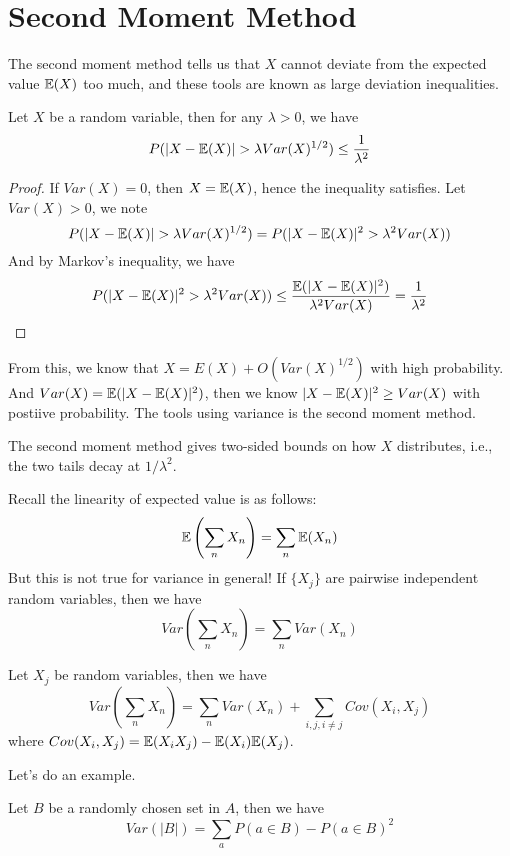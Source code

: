 \section{Second Moment Method}
The second moment method tells us that $X$ cannot deviate from the expected value $\mathbb{E}(X)$ too much, and these tools are known as large deviation inequalities.
\begin{thm}
    Let $X$ be a random variable, then for any $\lambda>0$, we have 
    \begin{equation*}
        P(|X-\E(X)|>\lambda Var(X)^{1/2})\leq\frac{1}{\lambda^2}
    \end{equation*}
\end{thm}
\begin{proof}
    If $Var(X)=0$, then $X=\mathbb{E}(X)$, hence the inequality satisfies. Let $Var(X)>0$, we note 
    \begin{equation*}
        P(|X-\E(X)|>\lambda Var(X)^{1/2})=P(|X-\E(X)|^2>\lambda^2 Var(X))
    \end{equation*}
    And by Markov's inequality, we have 
    \begin{equation*}
        P(|X-\mathbb{E}(X)|^2>\lambda^2 Var(X))\leq\frac{\mathbb{E}(|X-\mathbb{E}(X)|^2)}{\lambda^2Var(X)}=\frac{1}{\lambda^2}
    \end{equation*}
\end{proof}
From this, we know that $X=E(X)+O(Var(X)^{1/2})$ with high probability. And $Var(X)=\mathbb{E}(|X-\mathbb{E}(X)|^2)$, then we know $|X-\mathbb{E}(X)|^2\geq Var(X)$ with postiive probability. The tools using variance is the second moment method.
\begin{warn}
    The second moment method gives two-sided bounds on how $X$ distributes, i.e., the two tails decay at $1/\lambda^2$.
\end{warn}
Recall the linearity of expected value is as follows:
\begin{equation*}
    \mathbb{E}\left(\sum_n X_n\right)=\sum_n \mathbb{E}(X_n)
\end{equation*}
But this is not true for variance in general! If $\{X_j\}$ are pairwise independent random variables, then we have 
\begin{equation*}
    Var\left(\sum_n X_n\right)=\sum_nVar(X_n)
\end{equation*}
\begin{lem}
    Let $X_j$ be random variables, then we have 
    \begin{equation*}
        Var\left(\sum_n X_n\right)=\sum_n Var(X_n)+\sum_{i,j, i\neq j}Cov(X_i, X_j)
    \end{equation*}
    where $Cov(X_i, X_j)=\mathbb{E}(X_iX_j)-\mathbb{E}(X_i)\mathbb{E}(X_j)$.
\end{lem}
Let's do an example.
\begin{example}
    Let $B$ be a randomly chosen set in $A$, then we have 
    \begin{equation*}
        Var(|B|)=\sum_a P(a\in B)-P(a\in B)^2
    \end{equation*}
\end{example}

